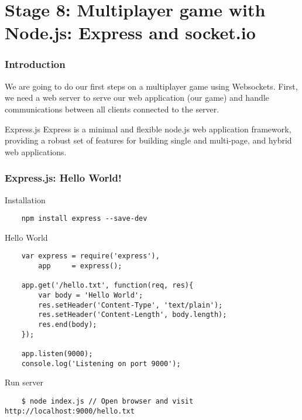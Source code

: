 \section{Stage 8: Multiplayer game with Node.js: Express and socket.io}

\begin{frame}[fragile]
  \begin{center}
  \end{center}
\end{frame}

\begin{frame}[fragile]
  \frametitle{Introduction}

  We are going to do our first steps on a multiplayer game using Websockets. First, we need a web server to serve our web application (our game) and handle communications between all clients connected to the server.

  \pause

  \begin{block}{Express.js}
    Express is a minimal and flexible node.js web application framework, providing a robust set of features for building single and multi-page, and hybrid web applications.
  \end{block}
\end{frame}
    
\begin{frame}[fragile]
  \frametitle{Express.js: Hello World!}

  \begin{block}{Installation}
    {\tiny
    \begin{verbatim}
    npm install express --save-dev
    \end{verbatim}
    }
  \end{block}

  \pause

  \begin{block}{Hello World}
    {\tiny
    \begin{verbatim}
    var express = require('express'),
        app     = express();

    app.get('/hello.txt', function(req, res){
        var body = 'Hello World';
        res.setHeader('Content-Type', 'text/plain');
        res.setHeader('Content-Length', body.length);
        res.end(body);
    });

    app.listen(9000);
    console.log('Listening on port 9000');
    \end{verbatim}
    }
  \end{block}

  \pause

  \begin{block}{Run server}
    {\tiny
    \begin{verbatim}
    $ node index.js // Open browser and visit http://localhost:9000/hello.txt
    \end{verbatim}
    }
  \end{block}
\end{frame}

